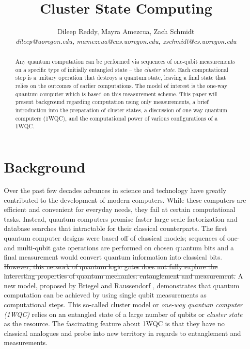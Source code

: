 \documentclass[twocolumn]{IEEEtran11}
\newcommand{\clb}{\color{blue}}
\newcommand{\clbl}{\color{black}}
\begin{document}


\title{\Large \bf Cluster State Computing}
\author{
Dileep Reddy, Mayra Amezcua, Zach Schmidt \\
{\em dileep@uoregon.edu, mamezcua@cas.uoregon.edu, zschmidt@cs.uoregon.edu }
}
\maketitle

\begin{abstract}
\clb Any quantum computation can be performed via sequences of one-qubit measurements on a specific type of initially entangled state -- the \textit{cluster state}\clbl. Each computational step is a unitary operation that destroys a quantum state, leaving a final state that relies on the outcomes of earlier computations. The model of interest is the one-way quantum computer which is based on this measurement scheme. This paper will present background regarding computation using only measurements, a brief introduction into the preparation of cluster states, a discussion of one way quantum computers (1WQC), and the computational power of various configurations of a 1WQC.
\end{abstract}


\section{Background}
Over the past few decades advances in science and technology have greatly contributed to the development of modern computers. While these computers are efficient and convenient for everyday needs, they fail at certain computational tasks. Instead, quantum computers promise faster large scale factorization and database searches that intractable for their classical counterparts. The first quantum computer designs were based off of classical models; sequences of \clb one- and multi-qubit \clbl gate \clb operations \clbl are performed on chosen quantum bits and a final measurement would convert quantum information into classical bits. \sout{However, this network of quantum logic gates does not fully explore the interesting properties of quantum mechanics: entanglement and measurement.} A new model, proposed by Briegel and Raussendorf \cite{briegel2000measurements}, demonstrates that quantum computation can be achieved by using single qubit measurements as computational steps. This so-called cluster model or \textit{one-way quantum computer (1WQC)} relies on an entangled state of a large number of qubits or \textit{cluster state} as the resource. The fascinating feature about 1WQC is that they have no classical analogues and probe into new territory in regards to entanglement and measurements. 
\end{document}

